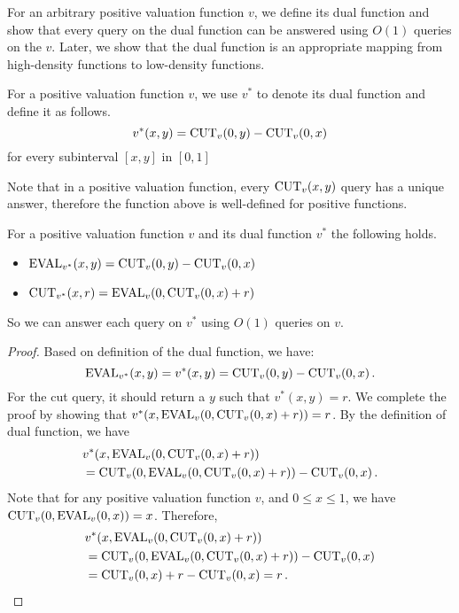 For an arbitrary positive valuation function $v$, we define its dual function and show that every query on the dual function can be answered using $O(1)$ queries on the $v$. Later, we show that the dual function is an appropriate mapping from high-density functions to low-density functions. 
\begin{definition}
For a positive valuation function $v$, we use $v^{*}$ to denote its dual function and define it as follows.
$$
v^{*}(x,y) = {\operatorname{CUT}}_{v}(0,y) - {\operatorname{CUT}}_{v}(0,x)
$$
for every subinterval $[x,y]$ in $[0,1]$
\end{definition}
Note that in a positive valuation function, every ${\operatorname{CUT}}_v(x,y)$ query has a unique answer, therefore the function above is well-defined for positive functions.
\begin{lemma}
\label{O1}
For a positive valuation function $v$ and its dual function $v^{*}$ the following holds.
\begin{itemize}
\item ${\operatorname{EVAL}}_{v^{*}}(x,y) = {\operatorname{CUT}}_{v}(0,y) - {\operatorname{CUT}}_{v}(0,x)$
\item ${\operatorname{CUT}}_{v^{*}}(x,r) = {\operatorname{EVAL}}_{v}(0,{\operatorname{CUT}}_{v}(0,x)+r)$
\end{itemize}
So we can answer each query on $v^{*}$ using $O(1)$ queries on $v$.
\end{lemma}
\begin{proof}
Based on definition of the dual function, we have:
$$
{\operatorname{EVAL}}_{v^{*}}(x,y)= v^{*}(x,y) = {\operatorname{CUT}}_{v}(0,y) - {\operatorname{CUT}}_{v}(0,x) \,.
$$
For the cut query, it should return a $y$ such that $v^*(x,y)=r$. We complete the proof by showing that $v^*(x, {\operatorname{EVAL}}_{v}(0,{\operatorname{CUT}}_{v}(0,x)+r))=r$. By the definition of dual function, we have
\begin{align*}
&v^{*}(x,{\operatorname{EVAL}}_{v}(0,{\operatorname{CUT}}_{v}(0,x)+r)) \\
&= {\operatorname{CUT}}_{v}(0,{\operatorname{EVAL}}_{v}(0,{\operatorname{CUT}}_{v}(0,x)+r)) - {\operatorname{CUT}}_{v}(0,x) \,.
\end{align*}
Note that for any positive valuation function $v$, and $0 \le x \le 1$, we have ${\operatorname{CUT}}_v(0,{\operatorname{EVAL}}_v(0,x))=x$. Therefore,
\begin{align*}
&v^{*}(x,{\operatorname{EVAL}}_{v}(0,{\operatorname{CUT}}_{v}(0,x)+r)) \\
&= {\operatorname{CUT}}_{v}(0,{\operatorname{EVAL}}_{v}(0,{\operatorname{CUT}}_{v}(0,x)+r)) - {\operatorname{CUT}}_{v}(0,x) \\
&= {\operatorname{CUT}}_{v}(0,x)+r - {\operatorname{CUT}}_{v}(0,x) = r \,.
\end{align*}
\end{proof}\\
